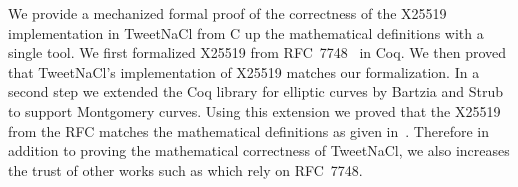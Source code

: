 We provide a mechanized formal proof of the correctness of the X25519
implementation in TweetNaCl from C up the mathematical definitions with a single tool.
We first formalized X25519 from RFC~7748~\cite{rfc7748} in Coq.
We then proved that TweetNaCl's implementation of X25519 matches our formalization.
In a second step we extended the Coq library for elliptic curves \cite{BartziaS14}
by Bartzia and Strub to support Montgomery curves.
Using this extension we proved that the X25519 from the RFC matches the
mathematical definitions as given in~\cite[Sec.~2]{Ber06}.
Therefore in addition to proving the mathematical correctness of TweetNaCl,
we also increases the trust of other works such as
\cite{zinzindohoue2017hacl,Erbsen2016SystematicSO} which rely on RFC~7748.

